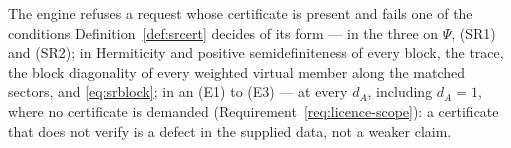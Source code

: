 
\begin{requirement}\label{req:failing-certificate}
The engine refuses a request whose certificate is present and fails one of
the conditions Definition~\ref{def:srcert} decides of its form --- in  the three on $\Psi$, (SR1) and (SR2); in  Hermiticity and
positive semidefiniteness of every block, the trace, the block diagonality of
every weighted virtual member along the matched sectors, and
\eqref{eq:srblock}; in an  (E1) to (E3) --- at every
$d_A$, including $d_A=1$, where no certificate is demanded
(Requirement~\ref{req:licence-scope}): a certificate that does not verify is
a defect in the supplied data, not a weaker claim.
\end{requirement}
